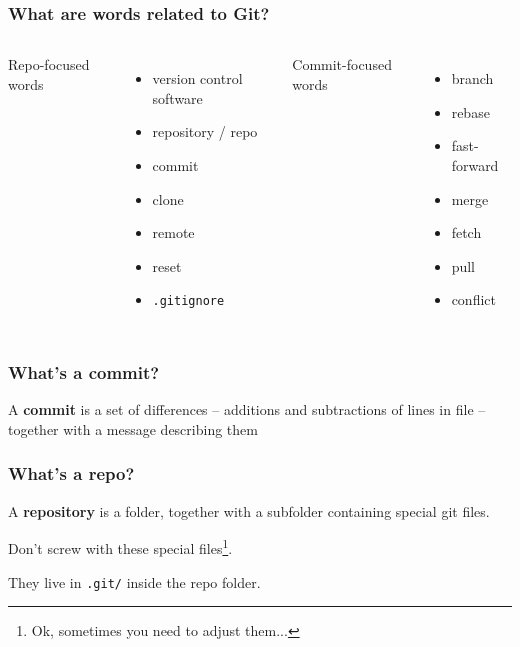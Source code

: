 \documentclass[14pt,aspectratio=1610]{beamer} %
\newcommand{\fframe}[2]{
   \begin{frame}
\frametitle{#1}
#2
\end{frame}
}
\begin{document}
\fframe{What are words related to Git?}
{
	\begin{columns}[t]
	\column{2in}
	Repo-focused words
	\begin{itemize}
		\item version control software
		\item repository / repo
		\item commit
		\item clone
		\item remote
		\item reset
		\item {\tt .gitignore}
	\end{itemize}

	\column{2in}
	Commit-focused words
	\begin{itemize}
		\item branch
		\item rebase
		\item fast-forward
		\item merge
		\item fetch
		\item pull
		\item conflict
	\end{itemize}
	\end{columns}
}





\fframe{What's a commit?}{

\begin{definition}
A {\bf commit} is a set of differences -- additions and subtractions of lines in file -- together with a message describing them
\end{definition}
}

\fframe{What's a repo?}
{
\begin{definition}
A {\bf repository} is a folder, together with a subfolder containing special git files.
\end{definition}

 Don't screw with these special files\footnote{Ok, sometimes you need to adjust them...}.

 They live in {\tt .git/} inside the repo folder.

}
\end{document}
